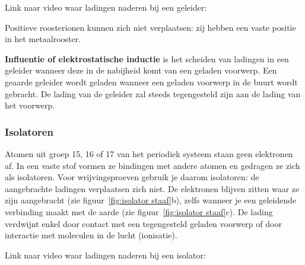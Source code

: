 \documentclass{ximera}
\begin{document}
\begin{onlineOnly}
    Link naar video waar ladingen naderen bij een geleider: 
\end{onlineOnly}

\begin{remark}
Positieve roosterionen kunnen zich niet verplaatsen: zij hebben een vaste positie in het metaalrooster.
\end{remark}

\begin{definition}[expandable=true,title={Influentie of elektrostatische inductie}]\nl
    \textbf{Influentie of elektrostatische inductie} is het scheiden van ladingen in een geleider wanneer deze in de nabijheid komt van een geladen voorwerp.
    Een geaarde geleider wordt geladen wanneer een geladen voorwerp in de buurt wordt gebracht. De lading van de geleider zal steeds tegengesteld zijn aan de lading van het voorwerp.
\end{definition}

\subsubsection{Isolatoren}

Atomen uit groep 15, 16 of 17 van het periodiek systeem staan geen elektronen af. In een vaste stof vormen ze bindingen met andere atomen en gedragen ze zich als isolatoren. Voor wrijvingsproeven gebruik je daarom isolatoren: de aangebrachte ladingen verplaatsen zich niet. De elektronen blijven zitten waar ze zijn aangebracht (zie figuur~\ref{fig:isolator staaf}b), zelfs wanneer je een geleidende verbinding maakt met de aarde (zie figuur~\ref{fig:isolator staaf}c). De lading verdwijnt enkel door contact met een tegengesteld geladen voorwerp of door interactie met moleculen in de lucht (ionisatie).

\begin{onlineOnly}
    Link naar video waar ladingen naderen bij een isolator: 
\end{onlineOnly}
\end{document}
